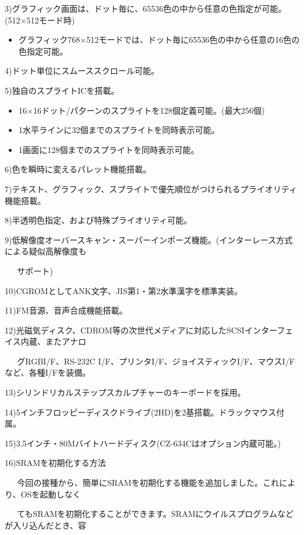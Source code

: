 \documentclass[twoside,a4paper,12pt]{article}
\begin{document}
3)グラフィック画面は、ドット毎に、65536色の中から任意の色指定が可能。(512×512モード時)

\begin{itemize}[leftmargin=30mm, itemsep=-1mm, topsep=1mm]
\item
グラフィック768×512モードでは、ドット毎に65536色の中から任意の16色の色指定可能。
\end{itemize}

4)ドット単位にスムーススクロール可能。

5)独自のスプライトICを搭載。

\begin{itemize}[leftmargin=30mm, itemsep=-1mm, topsep=1mm]
\item
16×16ドット/パ夕ーンのスプライトを128個定義可能。(最大256個)
\item
1水平ラインに32個までのスプライトを同時表示可能。
\item
1画面に128個までのスプライトを同時表示可能。
\end{itemize}

6)色を瞬時に変えるパレット機能搭載。

7)テキスト、グラフィック、スプライトで優先順位がつけられるプライオリティ機能搭載。

8)半透明色指定、および特殊プライオリティ可能。

9)低解像度オーバースキャン・スーパーインポーズ機能。(インターレース方式による疑似高解像度も

\ \ \ サポート)

10)CGROMとしてANK文字、JIS第1・第2水準漢字を標準実装。

11)FM音源、音声合成機能搭載。

12)光磁気ディスク、CDROM等の次世代メディアに対応したSCSIインターフェイス内蔵、またアナロ

\ \ \ グRGBI/F、RS-232C I/F、プリンタI/F、ジョイスティックI/F、マウスI/Fなど、各種I/Fを装備。

13)シリンドリカルステップスカルプチャーのキーボードを採用。

14)5インチフロッピーディスクドライブ(2HD)を2基搭載。ドラックマウス付属。

15)3.5インチ・80Mバイトハードディスク(CZ-634Cはオプション内蔵可能。)

16)SRAMを初期化する方法

\ \ \ 今回の接種から、簡単にSRAMを初期化する機能を追加しました。これにより、OSを起動しなく

\ \ \ てもSRAMを初期化することができます。SRAMにウイルスプログラムなどが入リ込んだとき、容
\end{document}
